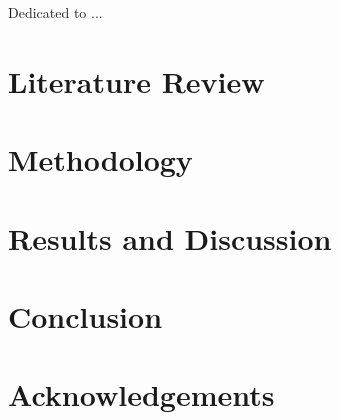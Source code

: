 \documentclass[a4paper, 12pt, twoside]{book}
\newenvironment{dedication}
  {\clearpage \thispagestyle{empty} \vspace*{\stretch{1}} \itshape \raggedleft}
  {\par \vspace{\stretch{3}} \clearpage}
\begin{document}
\clearpage

\begin{dedication}

    Dedicated to ...

\end{dedication}


    \tableofcontents
    \clearpage
    \sloppy



\chapter{Literature Review}
\blindtext[7] %

\chapter{Methodology}
\blindtext[5] %

\chapter{Results and Discussion}
\blindtext[7] %

\chapter{Conclusion}
\blindtext[3] %

\chapter*{Acknowledgements}
\thispagestyle{empty}
\blindtext[1] %

\clearpage


\clearpage
\listoffigures
{}

\clearpage
\listoftables
{}

\clearpage
\end{document}

